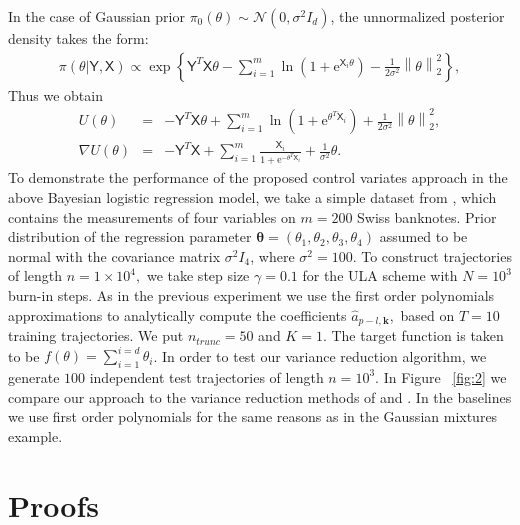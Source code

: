 \documentclass[bj]{imsart}
\def\rme{\mathrm{e}}
\begin{document}
In the case of  Gaussian prior $\pi_0(\theta) \sim \mathcal{N}(0,\sigma^2 I_d)$, the unnormalized posterior density takes the form:
\begin{eqnarray*}
\pi(\theta | \mathsf{Y}, \mathsf{X}) \propto \exp \left\{ \mathsf{Y}^T \mathsf{X} \theta - \sum\limits_{i=1}^m \ln{\left(1 + \rme^{\mathsf{X}_i \theta}\right)} - \frac{1}{2\sigma^2} \left\|\theta\right\|_2^2 \right\},
\end{eqnarray*}
Thus we obtain
\begin{eqnarray*}
U(\theta) &=& -\mathsf{Y}^T \mathsf{X} \theta + \sum_{i=1}^m \ln{\left(1 + \rme^{\theta^T \mathsf{X}_i}\right)} + \frac{1}{2\sigma^2} \left\| \theta\right\|_2^2, 
\\
\nabla U(\theta) &=& -\mathsf{Y}^T \mathsf{X} + \sum_{i=1}^m \frac{\mathsf{X}_i}{1 + \rme^{-\mathsf{\theta}^T \mathsf{X}_i}} + \frac{1}{\sigma^2} \theta.
\end{eqnarray*}
To demonstrate the performance of the proposed control variates approach in the above Bayesian logistic regression model, we take a simple dataset from \cite{mira2013zero}, which contains the measurements of four variables on $m=200$ Swiss banknotes. Prior distribution of the regression parameter $\mathbf{\theta} = \left( \theta_1, \theta_2, \theta_3, \theta_4 \right)$ assumed to be normal with the covariance matrix $\sigma^2 I_4$, where $\sigma^2 = 100$. To construct trajectories of length $n = 1 \times 10^4, $ we take step size $\gamma = 0.1$ for the ULA scheme with $N = 10^3$ burn-in steps. As in the previous experiment we use the first order polynomials approximations to analytically compute the coefficients $\hat{a}_{p-l,\mathbf{k}},$ based on $T = 10$ training trajectories. We put $n_{trunc} = 50$ and $K = 1$. The target function is taken to be $f(\theta) = \sum_{i=1}^{i=d}\theta_i$.  In order to test our variance reduction algorithm, we generate \(100\) independent test trajectories of length $n = 10^3$. In Figure ~\ref{fig:2} we compare our approach to the variance reduction methods of \cite{mira2013zero} and \cite{belomestny2019esvm}. In the baselines we use first order polynomials for the same reasons as in the Gaussian mixtures example.

\section{Proofs}
\label{sec:proofs}
\end{document}
